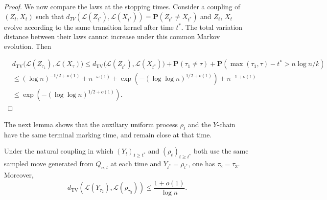 \begin{proof}
We now compare the laws at the stopping times. Consider a coupling of $(Z_t,X_t)$ such that $d_{TV}(\mathcal{L}(Z_{t^*}),\mathcal{L}(X_{t^*})) = \mathbf{P}(Z_{t^*} \neq X_{t^*})$ and $Z_t$, $X_t$ evolve according to the same transition kernel after time \(t^*\). The total variation distance between their laws cannot increase under this common Markov evolution. Then

$$
\begin{aligned}
    &d_{\mathrm{TV}}\bigl(\mathcal L(Z_{\tau_1}),\mathcal L(X_\tau)\bigr)
    \leq
    d_{\mathrm{TV}}\bigl(\mathcal L(Z_{t^*}),\mathcal L(X_{t^*})\bigr)
    +\mathbf P(\tau_1\neq \tau)+  \mathbf P(\max(\tau_1,\tau) - t^*> n\log n/k) \\
    &\leq
    (\log n)^{-1/2+o(1)}
    +n^{-\omega(1)}
    +\exp\left(-(\log\log n)^{1/2+o(1)}\right)  + n^{-1+o(1)}\\
    &\leq
    \exp\left(-(\log\log n)^{1/2+o(1)}\right).
\end{aligned}
$$
\end{proof}

The next lemma shows that the auxiliary uniform process $\rho_t$ and the $Y$-chain have the same terminal marking time, and remain close at that time.

\begin{lemma}\label{lem: Y and rho}
    Under the natural coupling in which $(Y_t)_{t\ge t^*}$ and $(\rho_t)_{t\ge t^*}$ both use the same sampled move generated from $Q_{n,t}$ at each time and $Y_{t^*} = \rho_{t^*}$, one has $\tau_2=\tau_3$. Moreover,
    \[
    d_{\mathrm{TV}}(\mathcal L(Y_{\tau_2}), \mathcal L(\rho_{\tau_3})) \leq \frac{1+o(1)}{\log n}.
    \]
\end{lemma}


